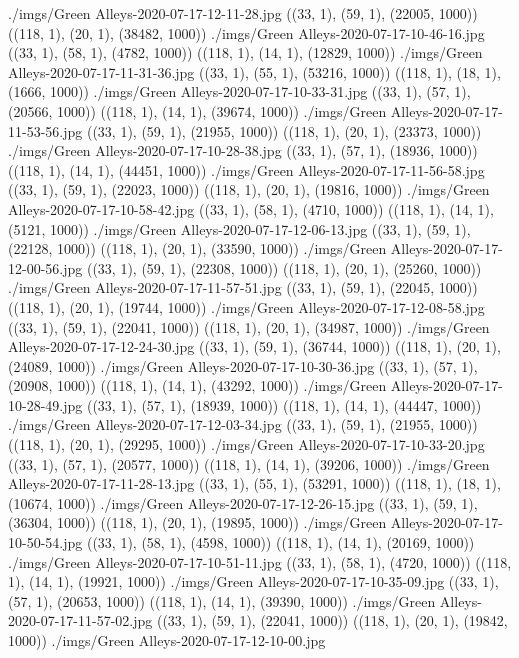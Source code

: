 ./imgs/Green Alleys-2020-07-17-12-11-28.jpg
((33, 1), (59, 1), (22005, 1000))
((118, 1), (20, 1), (38482, 1000))
./imgs/Green Alleys-2020-07-17-10-46-16.jpg
((33, 1), (58, 1), (4782, 1000))
((118, 1), (14, 1), (12829, 1000))
./imgs/Green Alleys-2020-07-17-11-31-36.jpg
((33, 1), (55, 1), (53216, 1000))
((118, 1), (18, 1), (1666, 1000))
./imgs/Green Alleys-2020-07-17-10-33-31.jpg
((33, 1), (57, 1), (20566, 1000))
((118, 1), (14, 1), (39674, 1000))
./imgs/Green Alleys-2020-07-17-11-53-56.jpg
((33, 1), (59, 1), (21955, 1000))
((118, 1), (20, 1), (23373, 1000))
./imgs/Green Alleys-2020-07-17-10-28-38.jpg
((33, 1), (57, 1), (18936, 1000))
((118, 1), (14, 1), (44451, 1000))
./imgs/Green Alleys-2020-07-17-11-56-58.jpg
((33, 1), (59, 1), (22023, 1000))
((118, 1), (20, 1), (19816, 1000))
./imgs/Green Alleys-2020-07-17-10-58-42.jpg
((33, 1), (58, 1), (4710, 1000))
((118, 1), (14, 1), (5121, 1000))
./imgs/Green Alleys-2020-07-17-12-06-13.jpg
((33, 1), (59, 1), (22128, 1000))
((118, 1), (20, 1), (33590, 1000))
./imgs/Green Alleys-2020-07-17-12-00-56.jpg
((33, 1), (59, 1), (22308, 1000))
((118, 1), (20, 1), (25260, 1000))
./imgs/Green Alleys-2020-07-17-11-57-51.jpg
((33, 1), (59, 1), (22045, 1000))
((118, 1), (20, 1), (19744, 1000))
./imgs/Green Alleys-2020-07-17-12-08-58.jpg
((33, 1), (59, 1), (22041, 1000))
((118, 1), (20, 1), (34987, 1000))
./imgs/Green Alleys-2020-07-17-12-24-30.jpg
((33, 1), (59, 1), (36744, 1000))
((118, 1), (20, 1), (24089, 1000))
./imgs/Green Alleys-2020-07-17-10-30-36.jpg
((33, 1), (57, 1), (20908, 1000))
((118, 1), (14, 1), (43292, 1000))
./imgs/Green Alleys-2020-07-17-10-28-49.jpg
((33, 1), (57, 1), (18939, 1000))
((118, 1), (14, 1), (44447, 1000))
./imgs/Green Alleys-2020-07-17-12-03-34.jpg
((33, 1), (59, 1), (21955, 1000))
((118, 1), (20, 1), (29295, 1000))
./imgs/Green Alleys-2020-07-17-10-33-20.jpg
((33, 1), (57, 1), (20577, 1000))
((118, 1), (14, 1), (39206, 1000))
./imgs/Green Alleys-2020-07-17-11-28-13.jpg
((33, 1), (55, 1), (53291, 1000))
((118, 1), (18, 1), (10674, 1000))
./imgs/Green Alleys-2020-07-17-12-26-15.jpg
((33, 1), (59, 1), (36304, 1000))
((118, 1), (20, 1), (19895, 1000))
./imgs/Green Alleys-2020-07-17-10-50-54.jpg
((33, 1), (58, 1), (4598, 1000))
((118, 1), (14, 1), (20169, 1000))
./imgs/Green Alleys-2020-07-17-10-51-11.jpg
((33, 1), (58, 1), (4720, 1000))
((118, 1), (14, 1), (19921, 1000))
./imgs/Green Alleys-2020-07-17-10-35-09.jpg
((33, 1), (57, 1), (20653, 1000))
((118, 1), (14, 1), (39390, 1000))
./imgs/Green Alleys-2020-07-17-11-57-02.jpg
((33, 1), (59, 1), (22041, 1000))
((118, 1), (20, 1), (19842, 1000))
./imgs/Green Alleys-2020-07-17-12-10-00.jpg
